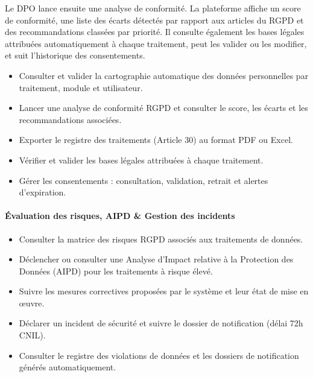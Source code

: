 \documentclass[12pt,a4paper]{report}
\begin{document}
Le DPO lance ensuite une analyse de conformité. La plateforme affiche un score de conformité, une liste des écarts détectés par rapport aux articles du RGPD et des recommandations classées par priorité. Il consulte également les bases légales attribuées automatiquement à chaque traitement, peut les valider ou les modifier, et suit l'historique des consentements.

\begin{itemize}[leftmargin=*, label=\textbullet]
    \item Consulter et valider la cartographie automatique des données personnelles par traitement, module et utilisateur.
    \item Lancer une analyse de conformité RGPD et consulter le score, les écarts et les recommandations associées.
    \item Exporter le registre des traitements (Article 30) au format PDF ou Excel.
    \item Vérifier et valider les bases légales attribuées à chaque traitement.
    \item Gérer les consentements : consultation, validation, retrait et alertes d'expiration.
\end{itemize}

\paragraph{Évaluation des risques, AIPD \& Gestion des incidents}
\begin{itemize}[leftmargin=*, label=\textbullet]
    \item Consulter la matrice des risques RGPD associés aux traitements de données.
    \item Déclencher ou consulter une Analyse d'Impact relative à la Protection des Données (AIPD) pour les traitements à risque élevé.
    \item Suivre les mesures correctives proposées par le système et leur état de mise en œuvre.
    \item Déclarer un incident de sécurité et suivre le dossier de notification (délai 72h CNIL).
    \item Consulter le registre des violations de données et les dossiers de notification générés automatiquement.
\end{itemize}
\end{document}
